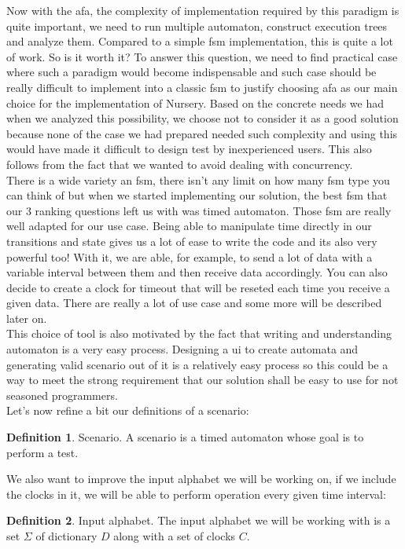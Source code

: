 \documentclass[12pt]{article}
\theoremstyle{definition}
\newtheorem{definition}{Definition}[section]
\theoremstyle{definition}
\theoremstyle{remark}
\begin{document}
Now with the \gls{afa}, the complexity of implementation required by this paradigm is quite important, we need to run multiple automaton, construct execution trees and analyze them. Compared to a simple \gls{fsm} implementation, this is quite a lot of work. So is it worth it? To answer this question, we need to find practical case where such a paradigm would become indispensable and such case should be really difficult to implement into a classic \gls{fsm} to justify choosing \gls{afa} as our main choice for the implementation of Nursery. Based on the concrete needs we had when we analyzed this possibility, we choose not to consider it as a good solution because none of the case we had prepared needed such complexity and using this would have made it difficult to design test by inexperienced users. This also follows from the fact that we wanted to avoid dealing with concurrency.\\

There is a wide variety an \gls{fsm}, there isn't any limit on how many \gls{fsm} type you can think of but when we started implementing our solution, the best \gls{fsm} that our 3 ranking questions left us with was timed automaton. Those \gls{fsm} are really well adapted for our use case. Being able to manipulate time directly in our transitions and state gives us a lot of ease to write the code and its also very powerful too! With it, we are able, for example, to send a lot of data with a variable interval between them and then receive data accordingly. You can also decide to create a clock for timeout that will be reseted each time you receive a given data. There are really a lot of use case and some more will be described later on.\\

This choice of tool is also motivated by the fact that writing and understanding automaton is a very easy process. Designing a \gls{ui} to create automata and generating valid scenario out of it is a relatively easy process so this could be a way to meet the strong requirement that our solution shall be easy to use for not seasoned programmers.\\

Let's now refine a bit our definitions of a scenario:
\theoremstyle{definition}
\begin{definition}{Scenario.} A scenario is a timed automaton whose goal is to perform a test.
\end{definition}

We also want to improve the input alphabet we will be working on, if we include the clocks in it, we will be able to perform operation every given time interval:
\theoremstyle{definition}
\begin{definition}{Input alphabet.} The input alphabet we will be working with is a set $\Sigma$ of dictionary $D$ along with a set of clocks $C$.
\end{definition}
\end{document}
